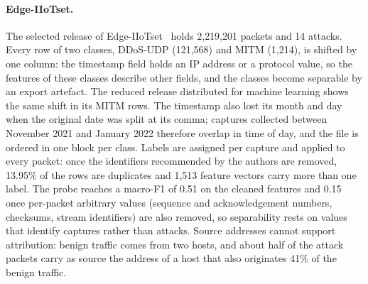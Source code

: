 \paragraph{Edge-IIoTset.}
The selected release of Edge-IIoTset~\cite{ferrag2022edgeiiotset} holds 2{,}219{,}201
packets and 14 attacks. Every row of two classes, DDoS-UDP (121{,}568) and MITM
(1{,}214), is shifted by one column: the timestamp field holds an IP address or a
protocol value, so the features of these classes describe other fields, and the classes
become separable by an export artefact. The reduced release distributed for machine
learning shows the same shift in its MITM rows. The timestamp also lost its month and
day when the original date was split at its comma; captures collected between November
2021 and January 2022 therefore overlap in time of day, and the file is ordered in one
block per class. Labels are assigned per capture and applied to every packet: once the
identifiers recommended by the authors are removed, 13.95\% of the rows are duplicates
and 1{,}513 feature vectors carry more than one label. The probe reaches a macro-F1 of
0.51 on the cleaned features and 0.15 once per-packet arbitrary values (sequence and
acknowledgement numbers, checksums, stream identifiers) are also removed, so
separability rests on values that identify captures rather than attacks. Source
addresses cannot support attribution: benign traffic comes from two hosts, and about
half of the attack packets carry as source the address of a host that also originates
41\% of the benign traffic.

